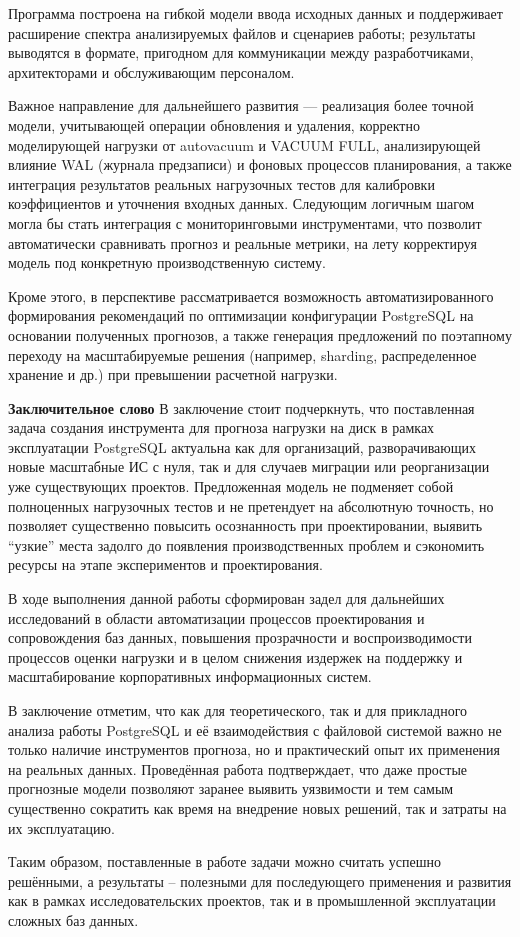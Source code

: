 Программа построена на гибкой модели ввода исходных данных и поддерживает расширение спектра анализируемых файлов 
и сценариев работы; результаты выводятся в формате, пригодном для коммуникации между разработчиками, архитекторами 
и обслуживающим персоналом.

Важное направление для дальнейшего развития — реализация более точной модели, учитывающей операции обновления и удаления, 
корректно моделирующей нагрузки от autovacuum и VACUUM FULL, анализирующей влияние WAL (журнала предзаписи) 
и фоновых процессов планирования, а также интеграция результатов реальных нагрузочных тестов для калибровки 
коэффициентов и уточнения входных данных. Следующим логичным шагом могла бы стать интеграция с мониторинговыми 
инструментами, что позволит автоматически сравнивать прогноз и реальные метрики, на лету корректируя модель 
под конкретную производственную систему.

Кроме этого, в перспективе рассматривается возможность автоматизированного формирования рекомендаций по оптимизации 
конфигурации PostgreSQL на основании полученных прогнозов, а также генерация предложений по поэтапному переходу 
на масштабируемые решения (например, sharding, распределенное хранение и др.) при превышении расчетной нагрузки.

\textbf{Заключительное слово}
В заключение стоит подчеркнуть, что поставленная задача создания инструмента для прогноза нагрузки на диск в рамках 
эксплуатации PostgreSQL актуальна как для организаций, разворачивающих новые масштабные ИС с нуля, так и для случаев 
миграции или реорганизации уже существующих проектов. Предложенная модель не подменяет собой полноценных нагрузочных 
тестов и не претендует на абсолютную точность, но позволяет существенно повысить осознанность при проектировании, 
выявить “узкие” места задолго до появления производственных проблем и сэкономить ресурсы на этапе экспериментов и проектирования.

В ходе выполнения данной работы сформирован задел для дальнейших исследований в области автоматизации процессов 
проектирования и сопровождения баз данных, повышения прозрачности и воспроизводимости процессов оценки нагрузки 
и в целом снижения издержек на поддержку и масштабирование корпоративных информационных систем.

В заключение отметим, что как для теоретического, так и для прикладного анализа работы PostgreSQL и её взаимодействия 
с файловой системой важно не только наличие инструментов прогноза, но и практический опыт их применения на реальных 
данных. Проведённая работа подтверждает, что даже простые прогнозные модели позволяют заранее выявить уязвимости 
и тем самым существенно сократить как время на внедрение новых решений, так и затраты на их эксплуатацию.

Таким образом, поставленные в работе задачи можно считать успешно решёнными, а результаты – полезными для последующего 
применения и развития как в рамках исследовательских проектов, так и в промышленной эксплуатации сложных баз данных.
